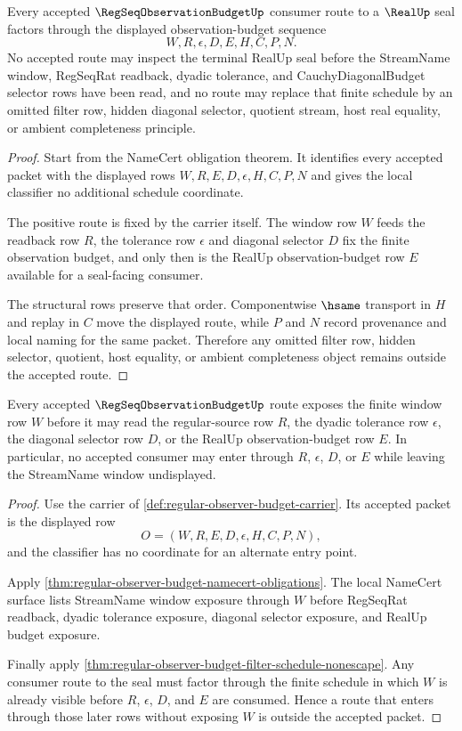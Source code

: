 \begin{theorem}
\label{thm:regular-observer-budget-filter-schedule-nonescape}
Every accepted $\RegSeqObservationBudgetUp$ consumer route to a $\RealUp$ seal factors through the displayed observation-budget sequence
$$
W,R,\epsilon,D,E,H,C,P,N.
$$
No accepted route may inspect the terminal RealUp seal before the StreamName window, RegSeqRat readback, dyadic tolerance, and CauchyDiagonalBudget selector rows have been read, and no route may replace that finite schedule by an omitted filter row, hidden diagonal selector, quotient stream, host real equality, or ambient completeness principle.
\end{theorem}
\begin{proof}
Start from the NameCert obligation theorem. It identifies every accepted packet with the displayed rows $W,R,E,D,\epsilon,H,C,P,N$ and gives the local classifier no additional schedule coordinate.

The positive route is fixed by the carrier itself. The window row $W$ feeds the readback row $R$, the tolerance row $\epsilon$ and diagonal selector $D$ fix the finite observation budget, and only then is the RealUp observation-budget row $E$ available for a seal-facing consumer.

The structural rows preserve that order. Componentwise $\hsame$ transport in $H$ and replay in $C$ move the displayed route, while $P$ and $N$ record provenance and local naming for the same packet. Therefore any omitted filter row, hidden selector, quotient, host equality, or ambient completeness object remains outside the accepted route.
\end{proof}

\begin{theorem}\label{thm:regseq-observation-budget-window-admission}
Every accepted $\RegSeqObservationBudgetUp$ route exposes the finite window row $W$ before it may read the regular-source row $R$, the dyadic tolerance row $\epsilon$, the diagonal selector row $D$, or the RealUp observation-budget row $E$. In particular, no accepted consumer may enter through $R$, $\epsilon$, $D$, or $E$ while leaving the StreamName window undisplayed.
\end{theorem}
\begin{proof}
Use the carrier of \autoref{def:regular-observer-budget-carrier}. Its accepted packet is the displayed row
$$
O=(W,R,E,D,\epsilon,H,C,P,N),
$$
and the classifier has no coordinate for an alternate entry point.

Apply \autoref{thm:regular-observer-budget-namecert-obligations}. The local NameCert surface lists StreamName window exposure through $W$ before RegSeqRat readback, dyadic tolerance exposure, diagonal selector exposure, and RealUp budget exposure.

Finally apply \autoref{thm:regular-observer-budget-filter-schedule-nonescape}. Any consumer route to the seal must factor through the finite schedule in which $W$ is already visible before $R$, $\epsilon$, $D$, and $E$ are consumed. Hence a route that enters through those later rows without exposing $W$ is outside the accepted packet.
\end{proof}

